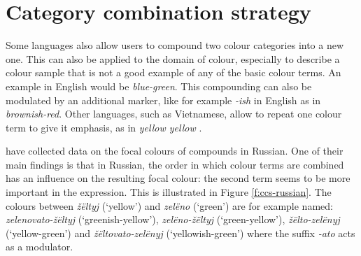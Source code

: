 \chapter{Category combination strategy}
\label{s:category-combination-strategy}

Some languages also allow users to compound two colour categories into
a new one. This can also be applied to the domain of colour,
especially to describe a colour sample that is not a good example of
any of the basic colour terms.  An example in English would be
\textit{blue-green}. This compounding can also be modulated by an
additional marker, like for example \textit{-ish} in English as in
\textit{brownish-red}. Other languages, such as Vietnamese, allow to repeat
one colour term to give it emphasis, as in \textit{yellow yellow}
\citep{alvarado02modifying}.

\cite{safuanova07russian} have collected data on the focal colours of
compounds in Russian. One of their main findings is that in Russian,
the order in which colour terms are combined has an influence on the
resulting focal colour: the second term seems to be more important in
the expression. This is illustrated in Figure \ref{f:ccs-russian}. The
colours between \textit{\v z\"eltyj} (`yellow') and \textit{zel\"eno} (`green') are
for example named: \textit{zelenovato-\v z\"eltyj} (`greenish-yellow'),
\textit{zel\"eno-\v z\"eltyj} (`green-yellow'), \textit{\v z\"elto-zel\"enyj}
(`yellow-green') and \textit{\v z\"eltovato-zel\"enyj} (`yellowish-green')
where the suffix \textit{-ato} acts as a modulator.


